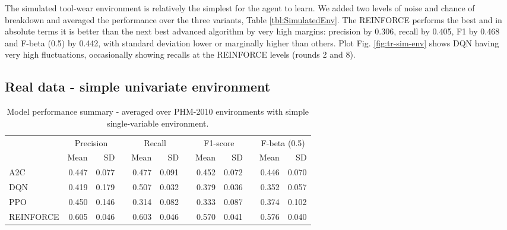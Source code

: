 \documentclass[a4paper, 12pt]{article}
\newcommand{\rowspace}[1]{\renewcommand{\arraystretch}{#1}}
\begin{document}
The simulated tool-wear environment is relatively the simplest for the agent to learn. We added two levels of noise and chance of breakdown and averaged the performance over the three variants, Table \ref{tbl:SimulatedEnv}. The REINFORCE performs the best and in absolute terms it is better than the next best advanced algorithm by very high margins: precision by 0.306, recall by 0.405, F1 by 0.468 and F-beta (0.5) by 0.442, with standard deviation lower or marginally higher than others. Plot Fig. \ref{fig:tr-sim-env} shows DQN having very high fluctuations, occasionally showing recalls at the REINFORCE levels (rounds 2 and 8).

\subsection{Real data - simple univariate environment}
\begin{table}[h]\centering
	\sffamily
	\rowspace{1.3}
	\begin{tabular}{@{}l rr c rr c rr c rr@{}}
		\arrayrulecolor{black!40}\toprule
		& \multicolumn{2}{c}{Precision} & \phantom{i} & \multicolumn{2}{c}{Recall} & \phantom{i} & \multicolumn{2}{c}{F1-score} & \phantom{i} & \multicolumn{2}{c}{F-beta (0.5)} \\
		\cmidrule{2-3} \cmidrule{5-6} \cmidrule{8-9} \cmidrule{11-12} 
		
		&Mean &SD & &Mean &SD & &Mean &SD& &Mean & SD\\ \midrule
		A2C & 0.447 & 0.077 & &0.477 & 0.091 & & 0.452 & 0.072 & &0.446 &0.070 \\
		DQN & 0.419 & 0.179 & &0.507 & 0.032 & & 0.379 & 0.036 & &0.352 &0.057 \\
		PPO & 0.450 & 0.146 & &0.314 & 0.082 & & 0.333 & 0.087 & &0.374 &0.102 \\
		REINFORCE & 0.605 & 0.046 & &0.603 & 0.046 & & 0.570 & 0.041 & &0.576 &0.040 \\
		
		\bottomrule
	\end{tabular}
	\caption{Model performance summary - averaged over PHM-2010 environments with simple single-variable environment.}
	\label{tbl:PHMSS}
\end{table}
\end{document}
